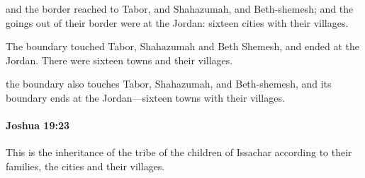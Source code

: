 			\begin{versebox}
					\item[BHS] 
					\item[ASV] and the border reached to Tabor, and Shahazumah, and Beth-shemesh; and the goings out of their border were at the Jordan: sixteen cities with their villages.
					\item[NIV] The boundary touched Tabor, Shahazumah and Beth Shemesh, and ended at the Jordan. There were sixteen towns and their villages.
					\item[NRSV] the boundary also touches Tabor, Shahazumah, and Beth-shemesh, and its boundary ends at the Jordan—sixteen towns with their villages.
			\end{versebox}

		\paragraph{Joshua 19:23} %
			\label{JOSHUA-19-23}

			This is the inheritance of the tribe of the children of Issachar according to their families, the cities and their villages.

